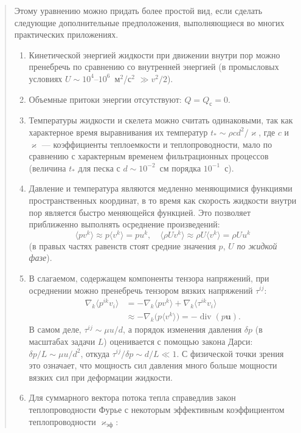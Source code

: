 \documentclass[12pt,a4paper]{article}
\DeclareMathOperator{\Div}{div}
\newenvironment{textquote}{\begin{quote}}{\end{quote}}
\begin{document}
\begin{textquote}
Этому уравнению можно придать более простой вид, если сделать следующие дополнительные предположения, выполняющиеся во многих практических приложениях.
\begin{enumerate}\sloppy
\item[а)] Кинетической энергией жидкости при движении внутри пор можно пренебречь по сравнению со внутренней энергией (в промысловых условиях $U\sim10^4$--$10^6$~м$^2$/с$^2$ $\gg v^2/2$).
\item[б)] Объемные притоки энергии отсутствуют: $Q=Q_{\text{с}}=0$.
\item[в)] Температуры жидкости и скелета можно считать одинаковыми, так как характерное время выравнивания их температур $t_*\sim\rho cd^2/\varkappa$, где $c$ и $\varkappa$ --- коэффициенты теплоемкости и теплопроводности, мало по сравнению с характерным временем фильтрационных процессов (величина $t_*$ для песка с $d\sim10^{-2}$~см порядка $10^{-1}$~с).
\item[г)] Давление и температура являются медленно меняющимися функциями пространственных координат, в то время как скорость жидкости внутри пор является быстро меняющейся функцией. Это позволяет приближенно выполнять осреднение произведений:
\[
\langle pv^k\rangle\approx p\langle v^k\rangle=pu^k,\quad
\langle\rho Uv^k\rangle\approx\rho U\langle v^k\rangle=\rho Uu^k
\]
(в правых частях равенств стоят средние значения $p$, $U$ \textit{по жидкой фазе}).
\item[д)] В слагаемом, содержащем компоненты тензора напряжений, при осреднении можно пренебречь тензором вязких напряжений $\tau^{ij}$:
\[
\begin{aligned}
\nabla_k\langle p^{ik}v_i\rangle
&=-\nabla_k\langle pv^k\rangle+\nabla_k\langle\tau^{ik}v_i\rangle\\
&\approx-\nabla_k\bigl(p\langle v^k\rangle\bigr)=-\Div(p\boldsymbol{u}).
\end{aligned}
\]
В самом деле, $\tau^{ij}\sim\mu u/d$, а порядок изменения давления $\delta p$ (в масштабах задачи $L$) оценивается с помощью закона Дарси: $\delta p/L\sim\mu u/d^2$, откуда $\tau^{ij}/\delta p\sim d/L\ll1$. С физической точки зрения это означает, что мощность сил давления много больше мощности вязких сил при деформации жидкости.
\item[е)] Для суммарного вектора потока тепла справедлив закон теплопроводности Фурье с некоторым эффективным коэффициентом теплопроводности $\varkappa_{\text{эф}}$:
\begin{equation}

\end{equation}
\end{enumerate}
\end{textquote}
\end{document}
